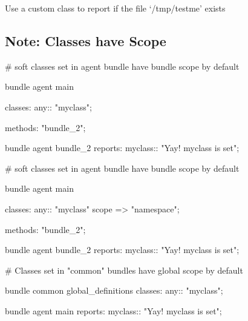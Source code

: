 \begin{aside}
\label{aside:exercise_33}

Use a custom class to report if the file `/tmp/testme' exists

\end{aside}





\subsection{Note: Classes have Scope}

\begin{codelisting}
\begin{code}
# soft classes set in agent bundle have bundle scope by default

bundle agent main
{
  classes:
    any::
      "myclass";

  methods:
    "bundle_2";
}

bundle agent bundle_2
{
  reports:
    myclass::
      "Yay!  myclass is set";
}

\end{code}
\end{codelisting}
\begin{codelisting}
\begin{code}
# soft classes set in agent bundle have bundle scope by default

bundle agent main
{
  classes:
    any::
      "myclass"
        scope => "namespace";

  methods:
    "bundle_2";
}

bundle agent bundle_2
{
  reports:
    myclass::
      "Yay!  myclass is set";
}

\end{code}
\end{codelisting}
\begin{codelisting}
\begin{code}
# Classes set in "common" bundles have global scope by default

bundle common global_definitions
{
  classes:
    any::
      "myclass";
}

bundle agent main
{
  reports:
    myclass::
      "Yay!  myclass is set";
}

\end{code}
\end{codelisting}
